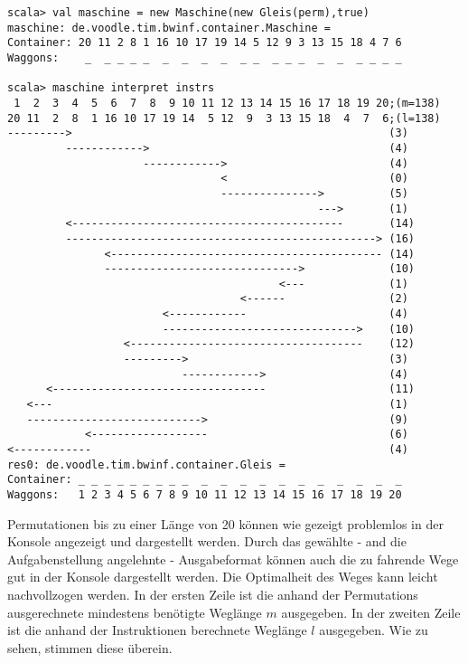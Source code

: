 \begin{lstlisting}
scala> val maschine = new Maschine(new Gleis(perm),true)      
maschine: de.voodle.tim.bwinf.container.Maschine = 
Container: 20 11 2 8 1 16 10 17 19 14 5 12 9 3 13 15 18 4 7 6
Waggons:    _  _ _ _ _  _  _  _  _  _ _  _ _ _  _  _  _ _ _ _

scala> maschine interpret instrs
 1  2  3  4  5  6  7  8  9 10 11 12 13 14 15 16 17 18 19 20;(m=138)
20 11  2  8  1 16 10 17 19 14  5 12  9  3 13 15 18  4  7  6;(l=138)
--------->                                                 (3)
         ------------>                                     (4)
                     ------------>                         (4)
                                 <                         (0)
                                 --------------->          (5)
                                                --->       (1)
         <------------------------------------------       (14)
         ------------------------------------------------> (16)
               <------------------------------------------ (14)
               ------------------------------>             (10)
                                          <---             (1)
                                    <------                (2)
                        <------------                      (4)
                        ------------------------------>    (10)
                  <------------------------------------    (12)
                  --------->                               (3)
                           ------------>                   (4)
      <---------------------------------                   (11)
   <---                                                    (1)
   --------------------------->                            (9)
            <------------------                            (6)
<------------                                              (4)
res0: de.voodle.tim.bwinf.container.Gleis = 
Container: _ _ _ _ _ _ _ _ _  _  _  _  _  _  _  _  _  _  _  _
Waggons:   1 2 3 4 5 6 7 8 9 10 11 12 13 14 15 16 17 18 19 20
\end{lstlisting}
\lstset{basicstyle=\ttfamily\normalsize}
Permutationen bis zu einer Länge von 20 können wie gezeigt problemlos in der Konsole angezeigt und dargestellt werden.
Durch das gewählte - and die Aufgabenstellung angelehnte - Ausgabeformat können auch die zu fahrende Wege gut in der Konsole dargestellt werden.
Die Optimalheit des Weges kann leicht nachvollzogen werden.
In der ersten Zeile ist die anhand der Permutations ausgerechnete mindestens benötigte Weglänge $m$ ausgegeben.
In der zweiten Zeile ist die anhand der Instruktionen berechnete Weglänge $l$ ausgegeben. Wie zu sehen, stimmen diese überein.
